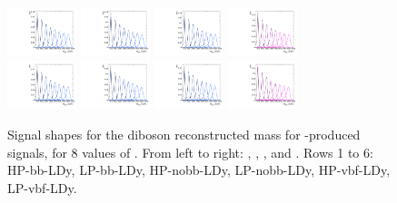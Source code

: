 \begin{figure}[htbp]
  \includegraphics[width=0.18\textwidth]{fig/2Dfit/templateSignalVsMX_fromDC_VBFGbuToWW_MVV_mu_HP_vbf_LDy.pdf}
  \includegraphics[width=0.18\textwidth]{fig/2Dfit/templateSignalVsMX_fromDC_VBFRadToWW_MVV_mu_HP_vbf_LDy.pdf}
  \includegraphics[width=0.18\textwidth]{fig/2Dfit/templateSignalVsMX_fromDC_VBFZprToWW_MVV_mu_HP_vbf_LDy.pdf}
  \includegraphics[width=0.18\textwidth]{fig/2Dfit/templateSignalVsMX_fromDC_VBFWprToWZ_MVV_mu_HP_vbf_LDy.pdf}\\
  \includegraphics[width=0.18\textwidth]{fig/2Dfit/templateSignalVsMX_fromDC_VBFGbuToWW_MVV_mu_LP_vbf_LDy.pdf}
  \includegraphics[width=0.18\textwidth]{fig/2Dfit/templateSignalVsMX_fromDC_VBFRadToWW_MVV_mu_LP_vbf_LDy.pdf}
  \includegraphics[width=0.18\textwidth]{fig/2Dfit/templateSignalVsMX_fromDC_VBFZprToWW_MVV_mu_LP_vbf_LDy.pdf}
  \includegraphics[width=0.18\textwidth]{fig/2Dfit/templateSignalVsMX_fromDC_VBFWprToWZ_MVV_mu_LP_vbf_LDy.pdf}\\
  \caption{
    Signal shapes for the diboson reconstructed mass \MVV for \VBF-produced signals, for 8 values of \MX.
    From left to right: \GBulktoWW, \RadtoWW, \ZprtoWW, and \WprtoWZ.
    Rows 1 to 6: HP-bb-LDy, LP-bb-LDy, HP-nobb-LDy, LP-nobb-LDy, HP-vbf-LDy, LP-vbf-LDy.
  }
  \label{fig:MVVShapes_VBF_LDy_Run2}
\end{figure}

